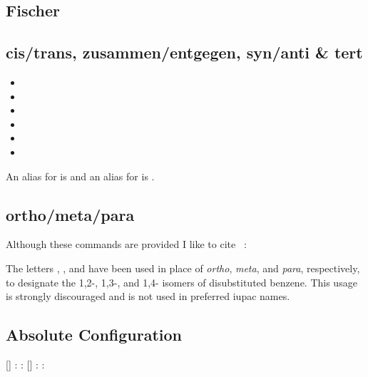 \documentclass{chemmacros-manual}
\begin{document}
\subsection{Fischer}
\begin{commands}
\end{commands}

\subsection{cis/trans, zusammen/entgegen, syn/anti \& tert}
\begin{itemize}
  \item {}   \iupac{\cis} \quad {} \iupac{\trans}
  \item {}   \iupac{\fac} \quad {}   \iupac{\mer}
  \item {}   \iupac{\sin} \quad {}   \iupac{\ter}
  \item {} \iupac{\zusammen} \quad {} \iupac{\entgegen}
  \item {}   \iupac{\syn} \quad {}  \iupac{\anti}
  \item {}  \iupac{\tert}
\end{itemize}
An alias for  is  and an alias for  is
.

\subsection{ortho/meta/para}
\begin{center}
     \iupac{\ortho} \quad
      \iupac{\meta} \quad
      \iupac{\para}
\end{center}

Although these commands are provided I like to cite
~\cite{iupac:bluebook}:

\begin{cnltxquote}
  The letters \iupac{\ortho}, \iupac{\meta}, and \iupac{\para} have been used
  in place of \textit{ortho}, \textit{meta}, and \textit{para}, respectively,
  to designate the 1,2-, 1,3-, and 1,4- isomers of disubstituted benzene.
  This usage is strongly discouraged and is not used in preferred \acs{iupac}
  names.
\end{cnltxquote}

\subsection{Absolute Configuration}
\begin{commands}
  []
    : \Rconf \quad {}\oarg{}: \Rconf[]
  []
    : \Sconf \quad {}\oarg{}: \Sconf[]
\end{commands}
\end{document}
